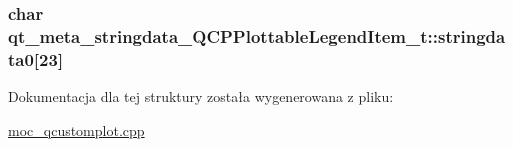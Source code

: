 \subsubsection[{\texorpdfstring{stringdata0}{stringdata0}}]{\setlength{\rightskip}{0pt plus 5cm}char qt\+\_\+meta\+\_\+stringdata\+\_\+\+Q\+C\+P\+Plottable\+Legend\+Item\+\_\+t\+::stringdata0\mbox{[}23\mbox{]}}\hypertarget{structqt__meta__stringdata___q_c_p_plottable_legend_item__t_a2add548f134b64b363d6ee1b2125da1d}{}\label{structqt__meta__stringdata___q_c_p_plottable_legend_item__t_a2add548f134b64b363d6ee1b2125da1d}


Dokumentacja dla tej struktury została wygenerowana z pliku\+:\begin{DoxyCompactItemize}
\item 
\hyperlink{moc__qcustomplot_8cpp}{moc\+\_\+qcustomplot.\+cpp}\end{DoxyCompactItemize}
